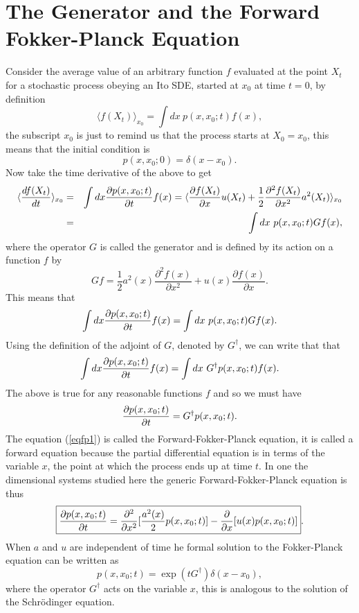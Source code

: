 \documentclass[11pt]{report}
\begin{document}
\section{The Generator and the Forward Fokker-Planck Equation}
Consider the  average value of an arbitrary function $f$ evaluated at the point $X_t$ for a stochastic process obeying an Ito SDE, started at $x_0$ at time $t=0$, by definition
\begin{equation}
\langle f(X_t)\rangle_{x_0}= \int dx \ p(x,x_0;t) f(x),
\end{equation}
the subscript $x_0$ is just to remind us that the process starts at $X_0=x_0$, this means that the initial condition is
\begin{equation}
p(x,x_0;0) =\delta(x-x_0).
\end{equation}
Now take the time derivative of the above to get
\begin{eqnarray}
\langle  \frac{d f(X_t)}{d t}\rangle_{x_0}&=& \int dx {\partial p(x,x_0;t)\over \partial t} f(x) =
 \langle {\partial f(X_t)\over \partial x}u(X_t)  + {1\over 2} {\partial^2 f(X_t)\over \partial x^2}a^2(X_t) \rangle_{x_0}\nonumber \\
&=& \int dx \ p(x,x_0;t) G f(x),
\end{eqnarray}
where the operator $G$ is called the generator and is defined by its action on a function $f$ by
\begin{equation}
Gf = \frac{1}{2}a^2(x) \frac{\partial^2f(x)}{\partial x^2} + u(x)  \frac{\partial f(x)}{\partial x}.
\end{equation}
This means that
\begin{equation}
\int dx {\partial p(x,x_0;t)\over \partial t} f(x) = \int dx \ p(x,x_0;t) Gf(x).
\end{equation}
Using the definition of  the adjoint of $G$, denoted by $G^\dagger$, we can write that that
\begin{equation}
\int dx {\partial p(x,x_0;t)\over \partial t} f(x)= \int dx \ G^\dagger p(x,x_0;t) f(x).
\end{equation}
The above is true for any reasonable functions $f$ and so we must have
\begin{equation}
{\partial p(x,x_0;t)\over \partial t} = G^\dagger p(x,x_0;t).\label{eqfp1}
\end{equation} 
The equation (\ref{eqfp1}) is called the Forward-Fokker-Planck equation, it is called a forward equation because the partial differential equation is in terms of the variable $x$, the point at which the process ends up at time $t$.  In one the dimensional systems studied here the generic Forward-Fokker-Planck equation is thus
\begin{equation}
\boxed{
{\partial p(x,x_0;t)\over \partial t} = \frac{\partial ^2}{\partial x^2}[ \frac{a^2(x)}{2} p(x,x_0;t)]
- \frac{\partial}{\partial x}[ u(x) p(x,x_0;t)]}.
\end{equation}
When $a$ and $u$ are independent of time he formal solution to the Fokker-Planck equation can be written as
\begin{equation}
p(x,x_0;t) =\exp(tG^\dagger) \delta(x-x_0),
\end{equation}
where the operator $G^\dagger$ acts on the variable $x$, this is
analogous to the solution of the Schr\"odinger equation.
\end{document}

